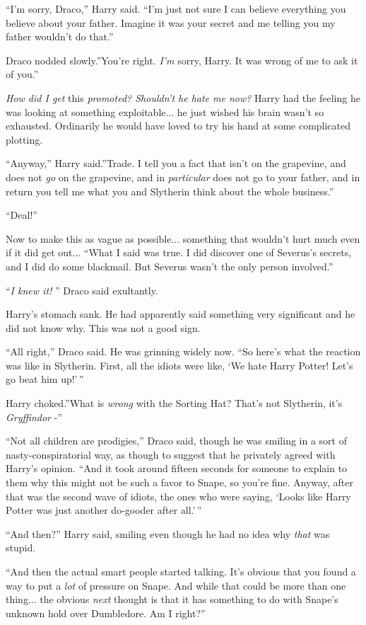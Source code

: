 ``I'm sorry, Draco,'' Harry said. ``I'm just not sure I can believe
everything you believe about your father. Imagine it was your secret and
me telling you my father wouldn't do that.''

Draco nodded slowly.''You're right. \emph{I'm} sorry, Harry. It was
wrong of me to ask it of you.''

\emph{How did I get} this \emph{promoted? Shouldn't he hate me now?}
Harry had the feeling he was looking at something exploitable... he
just wished his brain wasn't so exhausted. Ordinarily he would have
loved to try his hand at some complicated plotting.

``Anyway,'' Harry said.''Trade. I tell you a fact that isn't on the
grapevine, and does not \emph{go} on the grapevine, and in
\emph{particular} does not go to your father, and in return you tell me
what you and Slytherin think about the whole business.''

``Deal!''

Now to make this as vague as possible... something that wouldn't
hurt much even if it did get out... ``What I said was true. I did
discover one of Severus's secrets, and I did do some blackmail. But
Severus wasn't the only person involved.''

``\emph{I knew it!} '' Draco said exultantly.

Harry's stomach sank. He had apparently said something very significant
and he did not know why. This was not a good sign.

``All right,'' Draco said. He was grinning widely now. ``So here's what
the reaction was like in Slytherin. First, all the idiots were like, `We
hate Harry Potter! Let's go beat him up!'\,''

Harry choked.''What is \emph{wrong} with the Sorting Hat? That's not
Slytherin, it's \emph{Gryffindor} -''

``Not all children are prodigies,'' Draco said, though he was smiling in
a sort of nasty-conspiratorial way, as though to suggest that he
privately agreed with Harry's opinion. ``And it took around fifteen
seconds for someone to explain to them why this might not be such a
favor to Snape, so you're fine. Anyway, after that was the second wave
of idiots, the ones who were saying, `Looks like Harry Potter was just
another do-gooder after all.'\,''

``And then?'' Harry said, smiling even though he had no idea why
\emph{that} was stupid.

``And then the actual smart people started talking. It's obvious that you
found a way to put a \emph{lot} of pressure on Snape. And while that
could be more than one thing... the obvious \emph{next} thought is
that it has something to do with Snape's unknown hold over Dumbledore.
Am I right?''

